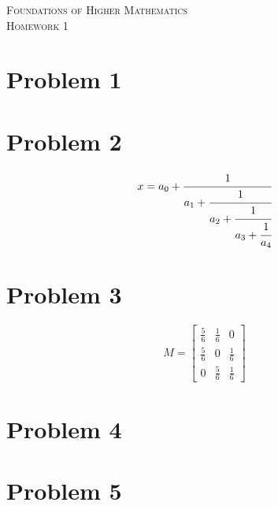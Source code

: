 \documentclass{article}
\newcommand{\classname}{
Foundations of Higher Mathematics
}
\newcommand{\assignment}{
1
}
\begin{document}
\begin{center}
\textsc{\Large \classname}\\[.3cm]
\textsc{\Large Homework \assignment}
\end{center}

\section*{Problem 1}
\lipsum[1]

\section*{Problem 2}
\begin{equation}
  x = a_0 + \cfrac{1}{a_1
          + \cfrac{1}{a_2
          + \cfrac{1}{a_3 + \cfrac{1}{a_4} } } }          \end{equation}
\lipsum[2]

\section*{Problem 3}
\begin{equation}
M = \begin{bmatrix}
       \frac{5}{6} & \frac{1}{6} & 0           \\[0.3em]
       \frac{5}{6} & 0           & \frac{1}{6} \\[0.3em]
       0           & \frac{5}{6} & \frac{1}{6}
     \end{bmatrix}
\end{equation}

\section*{Problem 4}
\lipsum[5-8]

\section*{Problem 5}
\lipsum[9-12]
\end{document}
